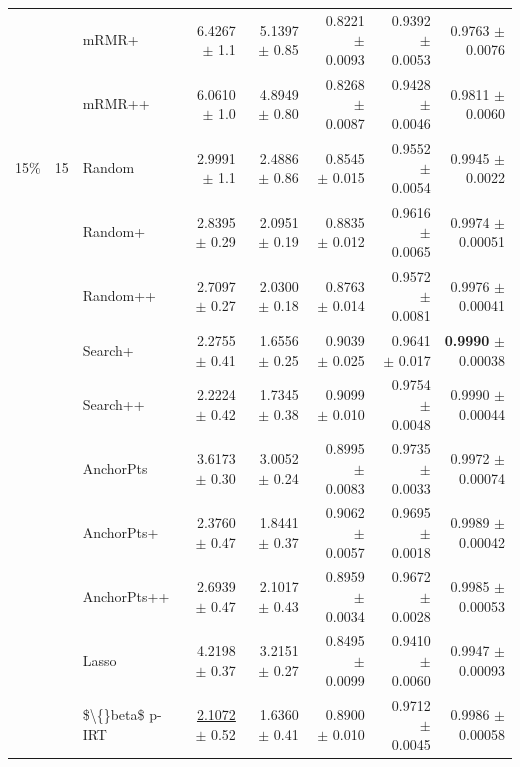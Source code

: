 \begin{longtable}{llp{}rrrrr}
 &  & mRMR+ & 6.4267 {\scriptsize $\pm$ 1.1} & 5.1397 {\scriptsize $\pm$ 0.85} & 0.8221 {\scriptsize $\pm$ 0.0093} & 0.9392 {\scriptsize $\pm$ 0.0053} & 0.9763 {\scriptsize $\pm$ 0.0076} \\
 &  & mRMR++ & 6.0610 {\scriptsize $\pm$ 1.0} & 4.8949 {\scriptsize $\pm$ 0.80} & 0.8268 {\scriptsize $\pm$ 0.0087} & 0.9428 {\scriptsize $\pm$ 0.0046} & 0.9811 {\scriptsize $\pm$ 0.0060} \\
\midrule
15\% & 15 & Random & 2.9991 {\scriptsize $\pm$ 1.1} & 2.4886 {\scriptsize $\pm$ 0.86} & 0.8545 {\scriptsize $\pm$ 0.015} & 0.9552 {\scriptsize $\pm$ 0.0054} & 0.9945 {\scriptsize $\pm$ 0.0022} \\
 &  & Random+ & 2.8395 {\scriptsize $\pm$ 0.29} & 2.0951 {\scriptsize $\pm$ 0.19} & 0.8835 {\scriptsize $\pm$ 0.012} & 0.9616 {\scriptsize $\pm$ 0.0065} & 0.9974 {\scriptsize $\pm$ 0.00051} \\
 &  & Random++ & 2.7097 {\scriptsize $\pm$ 0.27} & 2.0300 {\scriptsize $\pm$ 0.18} & 0.8763 {\scriptsize $\pm$ 0.014} & 0.9572 {\scriptsize $\pm$ 0.0081} & 0.9976 {\scriptsize $\pm$ 0.00041} \\
 &  & Search+ & 2.2755 {\scriptsize $\pm$ 0.41} & 1.6556 {\scriptsize $\pm$ 0.25} & 0.9039 {\scriptsize $\pm$ 0.025} & 0.9641 {\scriptsize $\pm$ 0.017} & \textbf{0.9990} {\scriptsize $\pm$ 0.00038} \\
 &  & Search++ & 2.2224 {\scriptsize $\pm$ 0.42} & 1.7345 {\scriptsize $\pm$ 0.38} & 0.9099 {\scriptsize $\pm$ 0.010} & 0.9754 {\scriptsize $\pm$ 0.0048} & 0.9990 {\scriptsize $\pm$ 0.00044} \\
 &  & AnchorPts & 3.6173 {\scriptsize $\pm$ 0.30} & 3.0052 {\scriptsize $\pm$ 0.24} & 0.8995 {\scriptsize $\pm$ 0.0083} & 0.9735 {\scriptsize $\pm$ 0.0033} & 0.9972 {\scriptsize $\pm$ 0.00074} \\
 &  & AnchorPts+ & 2.3760 {\scriptsize $\pm$ 0.47} & 1.8441 {\scriptsize $\pm$ 0.37} & 0.9062 {\scriptsize $\pm$ 0.0057} & 0.9695 {\scriptsize $\pm$ 0.0018} & 0.9989 {\scriptsize $\pm$ 0.00042} \\
 &  & AnchorPts++ & 2.6939 {\scriptsize $\pm$ 0.47} & 2.1017 {\scriptsize $\pm$ 0.43} & 0.8959 {\scriptsize $\pm$ 0.0034} & 0.9672 {\scriptsize $\pm$ 0.0028} & 0.9985 {\scriptsize $\pm$ 0.00053} \\
 &  & Lasso & 4.2198 {\scriptsize $\pm$ 0.37} & 3.2151 {\scriptsize $\pm$ 0.27} & 0.8495 {\scriptsize $\pm$ 0.0099} & 0.9410 {\scriptsize $\pm$ 0.0060} & 0.9947 {\scriptsize $\pm$ 0.00093} \\
 &  & \$\textbackslash\{\}beta\$ p-IRT & \underline{2.1072} {\scriptsize $\pm$ 0.52} & 1.6360 {\scriptsize $\pm$ 0.41} & 0.8900 {\scriptsize $\pm$ 0.010} & 0.9712 {\scriptsize $\pm$ 0.0045} & 0.9986 {\scriptsize $\pm$ 0.00058} \\

\end{longtable}
